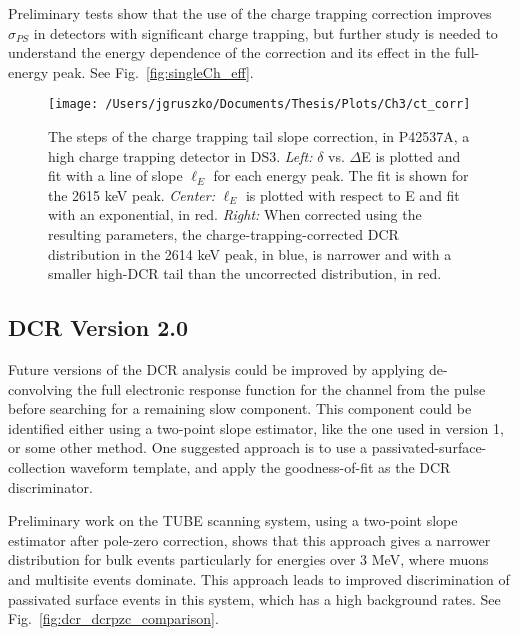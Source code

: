 Preliminary tests show that the use of the charge trapping correction improves $\sigma_{PS}$ in detectors with significant charge trapping, but further study is needed to understand the energy dependence of the correction and its effect in the full-energy peak. See Fig.~\ref{fig:singleCh_eff}.

\begin{figure*}[t]
 \centering
 \texttt{[image: /Users/jgruszko/Documents/Thesis/Plots/Ch3/ct\_corr]}
 \caption[The steps of the charge trapping tail slope correction]{The steps of the charge trapping tail slope correction, in P42537A, a high charge trapping detector in DS3. {\it Left:} $\delta$ vs. $\Delta$E is plotted and fit with a line of slope $\ell_E$ for each energy peak. The fit is shown for the 2615 keV peak. {\it Center:} $\ell_E$ is plotted with respect to E and fit with an exponential, in red. {\it Right:} When corrected using the resulting parameters, the charge-trapping-corrected DCR distribution in the 2614 keV peak, in blue, is narrower and with a smaller high-DCR tail than the uncorrected distribution, in red.} 
 \label{fig:ct_corr}
\end{figure*}


\subsection{DCR Version 2.0}
Future versions of the DCR analysis could be improved by applying de-convolving the full electronic response function for the channel from the pulse before searching for a remaining slow component. This component could be identified either using a two-point slope estimator, like the one used in version 1, or some other method. One suggested approach is to use a passivated-surface-collection waveform template, and apply the goodness-of-fit as the DCR discriminator. 

Preliminary work on the TUBE scanning system, using a two-point slope estimator after pole-zero correction, shows that this approach gives a narrower distribution for bulk events particularly for energies over 3 MeV, where muons and multisite events dominate. This approach leads to improved discrimination of passivated surface events in this system, which has a high background rates. See Fig.~\ref{fig:dcr_dcrpzc_comparison}.
%


